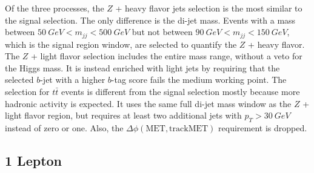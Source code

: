 Of the three processes,
the $Z$ + heavy flavor jets selection is the most similar to the signal selection.
The only difference is the di-jet mass.
Events with a mass between $\SI{50}{GeV} < m_{jj} < \SI{500}{GeV}$ but not between
$\SI{90}{GeV} < m_{jj} < \SI{150}{GeV}$, which is the signal region window,
are selected to quantify the $Z$ + heavy flavor.
The $Z$ + light flavor selection includes the entire mass range,
without a veto for the Higgs mass.
It is instead enriched with light jets by requiring that the selected $b$-jet with
a higher $b$-tag score fails the medium working point.
The selection for $t\bar{t}$ events is different from the signal selection
mostly because more hadronic activity is expected.
It uses the same full di-jet mass window as the $Z$ + light flavor region,
but requires at least two additional jets with $p_T > \SI{30}{GeV}$ instead of zero or one.
Also, the $\Delta \phi(\mathrm{MET}, \mathrm{track MET})$ requirement is dropped.

\subsection{1 Lepton} \label{sec:resolved-1}


